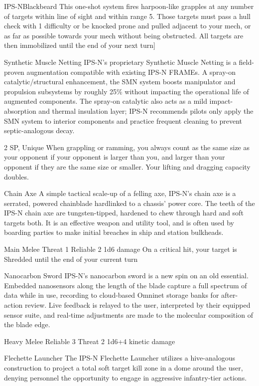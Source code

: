\begin{mech}{IPS-N}{Blackbeard}
{This one-shot system fires harpoon-like grapples at any number of targets within line of sight and within range 5. Those targets must pass a hull check with 1 difficulty or be knocked prone and pulled adjacent to your mech, or as far as possible towards your mech without being obstructed. All targets are then immobilized until the end of your next turn}]


Synthetic Muscle Netting
IPS-N’s proprietary Synthetic Muscle Netting is a field-proven augmentation compatible with existing IPS-N FRAMEs. A spray-on catalytic/structural enhancement, the SMN system boosts manipulator and propulsion subsystems by roughly 25\% without impacting the operational life of augmented components. The spray-on catalytic also acts as a mild impact-absorption and thermal insulation layer; IPS-N recommends pilots only apply the SMN system to interior components and practice frequent cleaning to prevent septic-analogous decay.  

2 SP, Unique
When grappling or ramming, you always count as the same size as your opponent if your opponent is larger than you, and larger than your opponent if they are the same size or smaller. Your lifting and dragging capacity doubles.

Chain Axe
A simple tactical scale-up of a felling axe, IPS-N’s chain axe is a serrated, powered chainblade hardlinked to a chassis’ power core. The teeth of the IPS-N chain axe are tungsten-tipped, hardened to chew through hard and soft targets both. It is an effective weapon and utility tool, and is often used by boarding parties to make initial breaches in ship and station bulkheads. 

Main Melee
Threat 1
Reliable 2
1d6 damage
On a critical hit, your target is Shredded until the end of your current turn

Nanocarbon Sword
IPS-N’s nanocarbon sword is a new spin on an old essential. Embedded nanosensors along the length of the blade capture a full spectrum of data while in use, recording to cloud-based Omninet storage banks for after-action review. Live feedback is relayed to the user, interpreted by their equipped sensor suite, and real-time adjustments are made to the molecular composition of the blade edge.

Heavy Melee
Reliable 3
Threat 2
1d6+4 kinetic damage

Flechette Launcher
The IPS-N Flechette Launcher utilizes a hive-analogous construction to project a total soft target kill zone in a dome around the user, denying personnel the opportunity to engage in aggressive infantry-tier actions. 


\end{mech}
